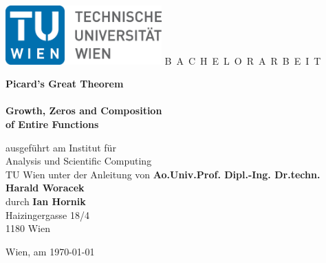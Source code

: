 \documentclass[a4paper,11pt,bibliography=totoc,listof=totoc,headinclude=true,cleardoublepage=empty,oneside]{scrbook}
\newcommand{\1}{\mathbbm{1}}
\theoremstyle{plain}
\theoremstyle{definition}
\begin{document}


\begin{titlepage}
  \begin{center}
    \includegraphics[width=0.45\textwidth]{TULogo.eps}
    \vskip 1cm%
    {\LARGE B~\Large A~C~H~E~L~O~R~A~R~B~E~I~T}
    \vskip 8mm
    {\huge\bfseries{} Picard's Great Theorem \\  \\ Growth, Zeros and Composition \\ of Entire Functions \par}
    \vskip 1cm
    \large 
    ausgef\"uhrt am    
    \vskip 0.75cm
    {\Large Institut f\"ur\\[1ex] Analysis und Scientific Computing}\\[1ex]
    {\Large TU Wien}
    \vskip0.75cm
    unter der Anleitung von
    \vskip0.75cm
    {\Large\bfseries Ao.Univ.Prof. Dipl.-Ing. Dr.techn. Harald Woracek}\\[1ex]
    \vskip 0.5cm
    durch
    \vskip 0.5cm
    {\Large\bfseries Ian Hornik}\\[1ex]
    {Haizingergasse 18/4}\\[1ex]
    {1180 Wien}
  \end{center}
  
  \vfill
  
  \small
  Wien, am \today
  \vspace*{-15mm}
\end{titlepage}

\cleardoublepage


\tableofcontents

\cleardoublepage
{}





\end{document}

